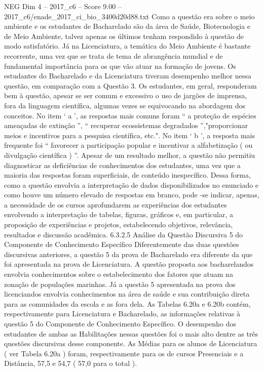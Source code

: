 \begin{textsample}{NEG Dim 4 – 2017\_c6 – Score 9.00 – 2017\_c6/enade\_2017\_ci\_bio\_3400d20d88.txt}
Como a questão era sobre o meio ambiente e os estudantes de Bacharelado são da área de Saúde, Biotecnologia e de Meio Ambiente, talvez apenas os últimos tenham respondido à questão de modo satisfatório.
Já na Licenciatura, a temática do Meio Ambiente é bastante recorrente, uma vez que se trata de tema de abrangência mundial e de fundamental importância para os que vão atuar na formação de jovens.
Os estudantes do Bacharelado e da Licenciatura tiveram desempenho melhor nessa questão, em comparação com a Questão 3.
Os estudantes, em geral, responderam bem à questão, apesar se ser comum e excessivo o uso de jargões de imprensa, fora da linguagem científica, algumas vezes se equivocando na abordagem dos conceitos.
No item ‘ a ’, as respostas mais comuns foram “ a proteção de espécies ameaçadas de extinção ”, “ recuperar ecossistemas degradados ”,"proporcionar meios e incentivos para a pesquisa científica, etc.".
No item ‘ b ’, a resposta mais frequente foi “ favorecer a participação popular e incentivar a alfabetização ( ou divulgação científica ) ”.
Apesar de um resultado melhor, a questão não permitiu diagnosticar as deficiências de conhecimentos dos estudantes, uma vez que a maioria das respostas foram superficiais, de conteúdo inespecífico.
Dessa forma, como a questão envolvia a interpretação de dados disponibilizados no enunciado e como houve um número elevado de respostas em branco, pode -se indicar, apenas, a necessidade de os cursos aprofundarem as experiências dos estudantes envolvendo a interpretação de tabelas, figuras, gráficos e, em particular, a proposição de experiências e projetos, estabelecendo objetivos, relevância, resultados e discussão acadêmica. 6.3.2.5 Análise da Questão Discursiva 5 do Componente de Conhecimento Específico Diferentemente das duas questões discursivas anteriores, a questão 5 da prova de Bacharelado era diferente da que foi apresentada na prova de Licenciatura.
A questão proposta aos bacharelandos envolvia conhecimentos sobre o estabelecimento dos fatores que atuam na zonação de populações marinhas.
Já a questão 5 apresentada na prova dos licenciandos envolvia conhecimentos na área de saúde e sua contribuição direta para as comunidades da escola e as fora dela.
As Tabelas 6.20a e 6.20b contém, respectivamente para Licenciatura e Bacharelado, as informações relativas à questão 5 do Componente de Conhecimento Específico.
O desempenho dos estudantes de ambas as Habilitações nessas questões foi o mais alto dentre as três questões discursivas desse componente.
As Médias para os alunos de Licenciatura ( ver Tabela 6.20a ) foram, respectivamente para os de cursos Presenciais e a Distância, 57,5 e 54,7 ( 57,0 para o total ).

\end{textsample}
